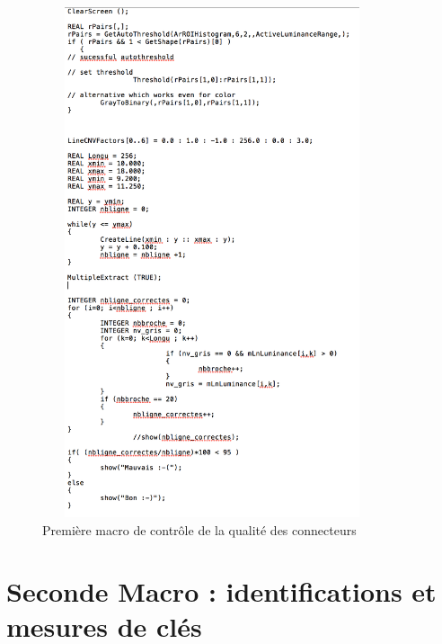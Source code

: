 \documentclass{scrreprt}
\begin{document}
\begin{figure}[!h]
\centering
\includegraphics[width=10cm, height=15cm]{images/first.png}
\caption{Première macro de contrôle de la qualité des connecteurs}
\end{figure}


\newpage
\section{Seconde Macro : identifications et mesures de clés}
\end{document}

